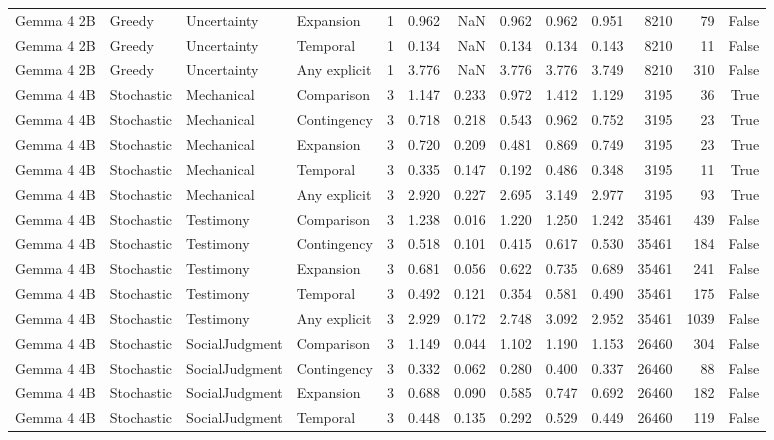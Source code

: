 \begin{tabular}{llllrrrrrrrrr}
Gemma 4 2B & Greedy & Uncertainty & Expansion & 1 & 0.962 & NaN & 0.962 & 0.962 & 0.951 & 8210 & 79 & False \\
Gemma 4 2B & Greedy & Uncertainty & Temporal & 1 & 0.134 & NaN & 0.134 & 0.134 & 0.143 & 8210 & 11 & False \\
Gemma 4 2B & Greedy & Uncertainty & Any explicit & 1 & 3.776 & NaN & 3.776 & 3.776 & 3.749 & 8210 & 310 & False \\
Gemma 4 4B & Stochastic & Mechanical & Comparison & 3 & 1.147 & 0.233 & 0.972 & 1.412 & 1.129 & 3195 & 36 & True \\
Gemma 4 4B & Stochastic & Mechanical & Contingency & 3 & 0.718 & 0.218 & 0.543 & 0.962 & 0.752 & 3195 & 23 & True \\
Gemma 4 4B & Stochastic & Mechanical & Expansion & 3 & 0.720 & 0.209 & 0.481 & 0.869 & 0.749 & 3195 & 23 & True \\
Gemma 4 4B & Stochastic & Mechanical & Temporal & 3 & 0.335 & 0.147 & 0.192 & 0.486 & 0.348 & 3195 & 11 & True \\
Gemma 4 4B & Stochastic & Mechanical & Any explicit & 3 & 2.920 & 0.227 & 2.695 & 3.149 & 2.977 & 3195 & 93 & True \\
Gemma 4 4B & Stochastic & Testimony & Comparison & 3 & 1.238 & 0.016 & 1.220 & 1.250 & 1.242 & 35461 & 439 & False \\
Gemma 4 4B & Stochastic & Testimony & Contingency & 3 & 0.518 & 0.101 & 0.415 & 0.617 & 0.530 & 35461 & 184 & False \\
Gemma 4 4B & Stochastic & Testimony & Expansion & 3 & 0.681 & 0.056 & 0.622 & 0.735 & 0.689 & 35461 & 241 & False \\
Gemma 4 4B & Stochastic & Testimony & Temporal & 3 & 0.492 & 0.121 & 0.354 & 0.581 & 0.490 & 35461 & 175 & False \\
Gemma 4 4B & Stochastic & Testimony & Any explicit & 3 & 2.929 & 0.172 & 2.748 & 3.092 & 2.952 & 35461 & 1039 & False \\
Gemma 4 4B & Stochastic & SocialJudgment & Comparison & 3 & 1.149 & 0.044 & 1.102 & 1.190 & 1.153 & 26460 & 304 & False \\
Gemma 4 4B & Stochastic & SocialJudgment & Contingency & 3 & 0.332 & 0.062 & 0.280 & 0.400 & 0.337 & 26460 & 88 & False \\
Gemma 4 4B & Stochastic & SocialJudgment & Expansion & 3 & 0.688 & 0.090 & 0.585 & 0.747 & 0.692 & 26460 & 182 & False \\
Gemma 4 4B & Stochastic & SocialJudgment & Temporal & 3 & 0.448 & 0.135 & 0.292 & 0.529 & 0.449 & 26460 & 119 & False \\

\end{tabular}

